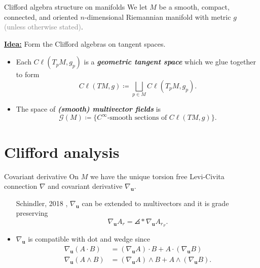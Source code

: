 \documentclass[aspectratio=169,handout]{beamer}
\newcommand\boldgreen[1]{\textcolor{lighter_csu_green}{\emph{\textbf{#1}}}}
\newcommand{\G}{\mathcal{G}}
\newcommand{\blade}[1]{\boldsymbol{#1}}
\DeclarePairedDelimiter\angles{\langle}{\rangle}
\newcommand{\proj}[2]{\angles*{#2}_{#1}}
\begin{document}
\begin{frame}{Clifford algebra structure on manifolds}
\vfill
\pause
We let $M$ be a smooth, compact, connected, and oriented $n$-dimensional Riemannian manifold with metric $g$ \textcolor{gray}{(unless otherwise stated)}.
\vspace*{0.5cm}

\noindent\textbf{\underline{Idea:}} Form the Clifford algebras on tangent spaces.
    \pause
    \begin{itemize}
        \item Each $C\ell(T_pM,g_p)$ is a \boldgreen{geometric tangent space} which we glue together to form
        \[
        C\ell(TM,g) \coloneqq \bigsqcup_{p\in M} C\ell(T_pM,g_p).
        \]
    
        \item The space of \boldgreen{(smooth) multivector fields} is
        \[
        \G(M) \coloneqq \{\textrm{$C^\infty$-smooth sections of $C\ell(TM,g)$}\}.
        \]
    \end{itemize}
\vfill
\end{frame}

\section{Clifford analysis}

\begin{frame}{Covariant derivative}
\vfill
    On $M$ we have the unique torsion free Levi-Civita connection $\nabla$ and covariant derivative $\nabla_{\blade{u}}$.
    \pause
    \begin{itemize}
        \item [Schindler, 2018], $\nabla_{\blade{u}}$ can be extended to multivectors and it is grade preserving 
        \[
        \nabla_{\blade{u}} A_r = \proj{r}{\nabla_{\blade{u}} A_r}.
        \]
    
        \item $\nabla_{\blade{u}}$ is compatible with dot and wedge since
        \begin{align*}
        \nabla_{\blade{u}}(A\cdot B) &= (\nabla_{\blade{u}} A)\cdot B + A \cdot (\nabla_{\blade{u}} B)\\
        \nabla_{\blade{u}}(A\wedge B) &= (\nabla_{\blade{u}} A) \wedge B + A \wedge (\nabla_{\blade{u}} B).
        \end{align*}
    \end{itemize}
\vfill
\end{frame}
\end{document}
